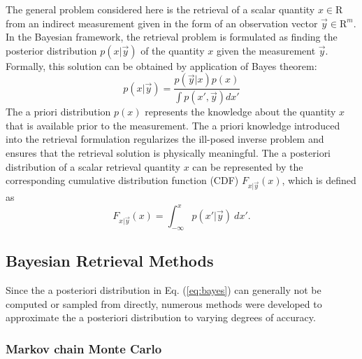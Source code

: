 \documentclass[journal abbreviation, manuscript]{copernicus}
\begin{document}
The general problem considered here is the retrieval of a scalar quantity $x \in
\mathrm{R}$ from an indirect measurement given in the form of an observation
vector $\vec{y} \in \mathrm{R}^m$. In the Bayesian framework, the retrieval
problem is formulated as finding the posterior distribution $p(x | \vec{y})$ of
the quantity $x$ given the measurement $\vec{y}$. Formally, this solution can be
obtained by application of Bayes theorem:
\begin{equation}\label{eq:bayes}
  p(x | \vec{y}) = \frac{p(\vec{y} | x)p(x)}{\int p(x', \vec{y}) dx'}
\end{equation}
The a priori distribution $p(x)$ represents the knowledge about the quantity $x$
that is available prior to the measurement. The a priori knowledge introduced
into the retrieval formulation regularizes the ill-posed inverse problem and
ensures that the retrieval solution is physically meaningful. The a posteriori
distribution of a scalar retrieval quantity $x$ can be represented by the
corresponding cumulative distribution function (CDF) $F_{x | \vec{y}}(x)$,
which is defined as 
\begin{equation}\label{eq:cdf}
F_{x | \vec{y}}(x) = \int_{-\infty}^{x} p(x' | \vec{y}) \: dx'.
\end{equation}

\subsection{Bayesian Retrieval Methods}

Since the a posteriori distribution in Eq. (\ref{eq:bayes}) can generally not
be computed or sampled from directly, numerous methods were developed to approximate
 the a posteriori distribution to varying degrees of accuracy. 

\subsubsection{Markov chain Monte Carlo}
\end{document}
